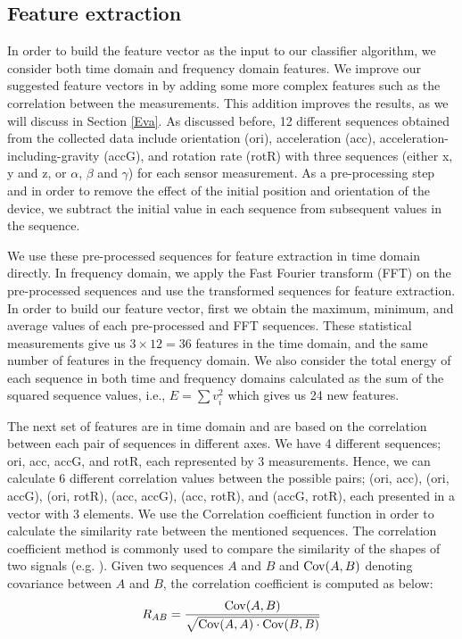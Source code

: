 \documentclass[10pt,twocolumn]{article}
\newcommand{\cov}{\ensuremath\mathrm{Cov}}
\begin{document}
\subsection{Feature extraction}
In order to build the feature vector as the input to our classifier algorithm, we consider both time domain and frequency domain features. We improve our suggested feature vectors in \cite{Mehrnezhad} by adding some more complex features such as the correlation between the measurements. This addition 
improves the results, as we will discuss in Section \ref{Eva}.
As discussed before, 12 different sequences obtained from the collected data include
orientation (ori), acceleration (acc), acceleration-including-gravity (accG), and rotation rate (rotR)
with three sequences (either x, y and z, or $\alpha$, $\beta$ and $\gamma$) for each sensor measurement. 
As a pre-processing step and in order to remove the effect of the initial position and orientation of the device, we subtract the initial value in each sequence from subsequent values in the sequence. 


We use these pre-processed sequences for feature extraction in time domain directly. In frequency domain, we apply the Fast Fourier transform (FFT) on the pre-processed sequences and use the transformed sequences for feature extraction.  
In order to build our feature vector, first we obtain the maximum, minimum, and average values of each pre-processed and FFT sequences. These statistical measurements give us $3\times 12 = 36$ features in the time domain, and the same number of features in the frequency domain.
We also consider the total energy of each sequence in both time and frequency domains calculated as the sum of the squared sequence values, i.e., $E=\sum{v_i^2}$ which gives us 24 new features. 

The next set of features are in time domain and are based on the correlation between each pair of sequences in different axes. We have 4 different sequences; ori, acc, accG, and rotR, each represented by 3 measurements. Hence, we can calculate 6 different correlation values between the possible pairs; (ori, acc), (ori, accG), (ori, rotR), (acc, accG), (acc, rotR), and (accG, rotR), each presented in a vector with 3 elements. We use the Correlation coefficient function in order to calculate the similarity rate between the mentioned sequences. The correlation coefficient method is commonly used to compare the similarity of the shapes of two signals (e.g. \cite{Shake4}). 
Given two sequences $A$ and $B$ and $\cov(A,B)$ denoting covariance between $A$ and $B$, the correlation coefficient is computed as below: 
\begin{equation}
{R_{AB}} = {\cov(A,B) \over \sqrt{\cov(A,A) \cdot \cov(B,B)}}
\label{eqTime}
\end{equation}
\end{document}
